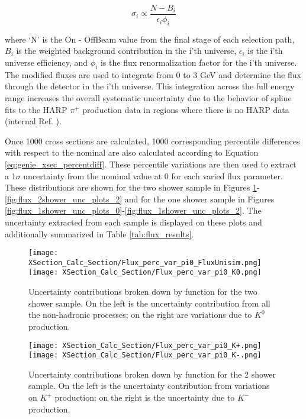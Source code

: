 \begin{equation} \label{eq:flux_xsec_var_0}
  \sigma_i \propto \frac{N - B_i}{\epsilon_i \phi_i} 
\end{equation}

\noindent where `N' is the On - OffBeam value from the final stage of each selection path, $B_i$ is the weighted background contribution in the i'th universe, $\epsilon_i$ is the i'th universe efficiency, and $\phi_i$ is the flux renormalization factor for the i'th universe.  The modified fluxes are used to integrate from 0 to 3 GeV and determine the flux through the detector in the i'th universe. This integration across the full energy range increases the overall systematic uncertainty due to the behavior of spline fits to the HARP $\pi^{+}$ production data in regions where there is no HARP data (internal Ref. \cite{bib:flux_uncertainty_tn}). 

Once 1000 cross sections are calculated, 1000 corresponding percentile differences with respect to the nominal are also calculated according to Equation \ref{eq:genie_xsec_percentdiff}. These percentile variations are then used to extract a 1$\sigma$ uncertainty from the nominal value at 0 for each varied flux parameter.  These distributions are shown for the two shower sample in Figures \ref{fig:flux_2shower_unc_plots_0}-\ref{fig:flux_2shower_unc_plots_2} and for the one shower sample in Figures \ref{fig:flux_1shower_unc_plots_0}-\ref{fig:flux_1shower_unc_plots_2}. The uncertainty extracted from each sample is displayed on these plots and additionally summarized in Table \ref{tab:flux_results}.  

\begin{figure}[H]
\centering
\texttt{[image: XSection\_Calc\_Section/Flux\_perc\_var\_pi0\_FluxUnisim.png]}
\texttt{[image: XSection\_Calc\_Section/Flux\_perc\_var\_pi0\_K0.png]}
\caption{ Uncertainty contributions broken down by function for the two shower sample. On the left is the uncertainty contribution from all the non-hadronic processes; on the right are variations due to $K^0$ production. }
\label{fig:flux_2shower_unc_plots_0}
\end{figure}

\begin{figure}[H]
\centering
\texttt{[image: XSection\_Calc\_Section/Flux\_perc\_var\_pi0\_K+.png]}
\texttt{[image: XSection\_Calc\_Section/Flux\_perc\_var\_pi0\_K-.png]}
\caption{ Uncertainty contributions broken down by function for the 2 shower sample. On the left is the uncertainty contribution from variations on $K^+$ production; on the right is the uncertainty due to $K^-$ production. }
\label{fig:flux_2shower_unc_plots_1}
\end{figure}

